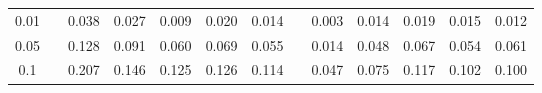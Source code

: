 % 
\begin{tabular}{ccccccccccccc}
  \hline
  \hline
0.01 &  & 0.038 & 0.027 & 0.009 & 0.020 & 0.014 &  & 0.003 & 0.014 & 0.019 & 0.015 & 0.012 \\ 
  0.05 &  & 0.128 & 0.091 & 0.060 & 0.069 & 0.055 &  & 0.014 & 0.048 & 0.067 & 0.054 & 0.061 \\ 
  0.1 &  & 0.207 & 0.146 & 0.125 & 0.126 & 0.114 &  & 0.047 & 0.075 & 0.117 & 0.102 & 0.100 \\ 
   \hline
\end{tabular}

